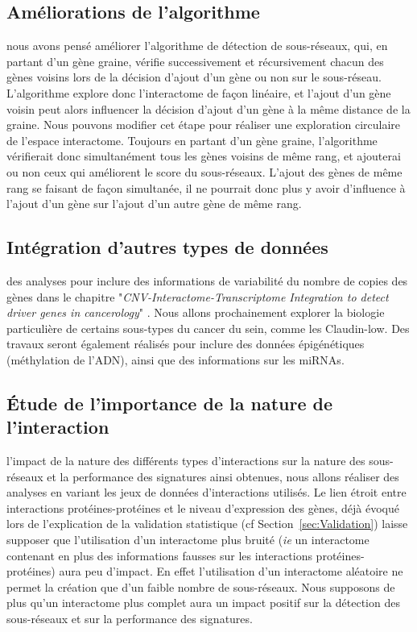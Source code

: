 		\subsection{\textcolor{blue!45!black}{Améliorations de l'algorithme}}
			 nous avons pensé améliorer l'algorithme de détection de sous-réseaux, qui, en partant d'un gène graine, vérifie successivement et récursivement chacun des gènes voisins lors de la décision d'ajout d'un gène ou non sur le sous-réseau.
			L'algorithme explore donc l'interactome de façon linéaire, et l'ajout d'un gène voisin peut alors influencer la décision d'ajout d'un gène à la même distance de la graine.
			Nous pouvons modifier cet étape pour réaliser une exploration circulaire de l'espace interactome.
			Toujours en partant d'un gène graine, l'algorithme vérifierait donc simultanément tous les gènes voisins de même rang, et ajouterai ou non ceux qui améliorent le score du sous-réseaux.
			L'ajout des gènes de même rang se faisant de façon simultanée, il ne pourrait donc plus y avoir d'influence à l'ajout d'un gène sur l'ajout d'un autre gène de même rang.

		\subsection{\textcolor{blue!45!black}{Intégration d'autres types de données}}
			 des analyses pour inclure des informations de variabilité du nombre de copies des gènes dans le chapitre "\emph{CNV-Interactome-Transcriptome Integration to detect driver genes in cancerology}" \citep{Garcia2013b}.
			Nous allons prochainement explorer la biologie particulière de certains sous-types du cancer du sein, comme les Claudin-low.
			Des travaux seront également réalisés pour inclure des données épigénétiques (méthylation de l'ADN), ainsi que des informations sur les \acsp{miRNA}.

		\subsection{\textcolor{blue!45!black}{Étude de l'importance de la nature de l'interaction}}
			 l'impact de la nature des différents types d'interactions sur la nature des sous-réseaux et la performance des signatures ainsi obtenues, nous allons réaliser des analyses en variant les jeux de données d'interactions utilisés.
			Le lien étroit entre interactions protéines-protéines et le niveau d’expression des gènes, déjà évoqué lors de l'explication de la validation statistique (cf Section~\ref{sec:Validation}) laisse supposer que l'utilisation d'un interactome plus bruité (\emph{ie} un interactome contenant en plus des informations fausses sur les interactions protéines-protéines) aura peu d'impact.
			En effet l'utilisation d'un interactome aléatoire ne permet la création que d'un faible nombre de sous-réseaux.
			Nous supposons de plus qu'un interactome plus complet aura un impact positif sur la détection des sous-réseaux et sur la performance des signatures.

